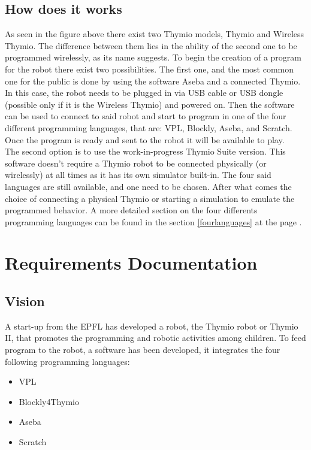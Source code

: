 \documentclass{scrbook}
\begin{document}
\section{How does it works \label{howdoesitworkref}} 

As seen in the figure above there exist two Thymio models, Thymio and Wireless Thymio. 
The difference between them lies in the ability of the second one to be programmed wirelessly, 
as its name suggests. To begin the creation of a program for the robot there exist two possibilities.
The first one, and the most common one for the public is done by using the software Aseba and a connected Thymio. 
In this case, the robot needs to be plugged in via USB cable or USB dongle (possible only if it is the Wireless Thymio) and powered on. 
Then the software can be used to connect to said robot and start to program in one of the four different programming languages, 
that are: VPL, Blockly, Aseba, and Scratch. Once the program is ready and sent to the robot it will be available to play. \\

The second option is to use the work-in-progress Thymio Suite version. 
This software doesn’t require a Thymio robot to be connected physically (or wirelessly) at all times as it has its own simulator built-in. 
The four said languages are still available, and one need to be chosen. 
After what comes the choice of connecting a physical Thymio or starting a simulation to emulate the programmed behavior.
A more detailed section on the four differents programming languages can be found in the section \ref{fourlanguages} at the page \pageref{fourlanguages}.

\chapter{Requirements Documentation}
\section{Vision}

A start-up from the EPFL has developed a robot, the Thymio robot or Thymio II, that promotes the programming and robotic activities among children. 
To feed program to the robot, a software has been developed, it integrates the four following programming languages: 
\begin{itemize}
  \item VPL
  \item Blockly4Thymio
  \item Aseba
  \item Scratch
\end{itemize}
\end{document}
